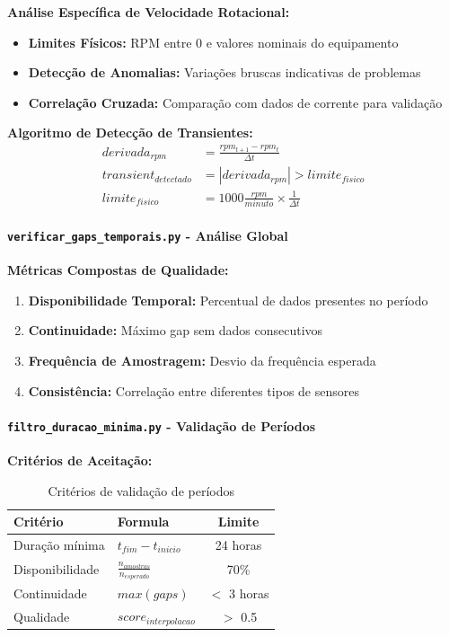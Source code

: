 \textbf{Análise Específica de Velocidade Rotacional:}

\begin{itemize}
    \item \textbf{Limites Físicos:} RPM entre 0 e valores nominais do equipamento
    \item \textbf{Detecção de Anomalias:} Variações bruscas indicativas de problemas
    \item \textbf{Correlação Cruzada:} Comparação com dados de corrente para validação
\end{itemize}

\textbf{Algoritmo de Detecção de Transientes:}
\begin{align}
derivada_{rpm} &= \frac{rpm_{t+1} - rpm_t}{\Delta t} \\
transient_{detectado} &= |derivada_{rpm}| > limite_{fisico} \\
limite_{fisico} &= 1000 \frac{rpm}{minuto} \times \frac{1}{\Delta t}
\end{align}

\paragraph{\texttt{verificar\_gaps\_temporais.py} - Análise Global}

\textbf{Métricas Compostas de Qualidade:}

\begin{enumerate}
    \item \textbf{Disponibilidade Temporal:} Percentual de dados presentes no período
    \item \textbf{Continuidade:} Máximo gap sem dados consecutivos
    \item \textbf{Frequência de Amostragem:} Desvio da frequência esperada
    \item \textbf{Consistência:} Correlação entre diferentes tipos de sensores
\end{enumerate}

\paragraph{\texttt{filtro\_duracao\_minima.py} - Validação de Períodos}

\textbf{Critérios de Aceitação:}

\begin{table}[H]
\centering
\caption{Critérios de validação de períodos}
\begin{tabular}{|l|l|c|}
\hline
\textbf{Critério} & \textbf{Formula} & \textbf{Limite} \\
\hline
Duração mínima & $t_{fim} - t_{inicio}$ & 24 horas \\
Disponibilidade & $\frac{n_{amostras}}{n_{esperado}}$ & 70\% \\
Continuidade & $max(gaps)$ & $<$ 3 horas \\
Qualidade & $score_{interpolacao}$ & $>$ 0.5 \\
\hline
\end{tabular}
\end{table}

